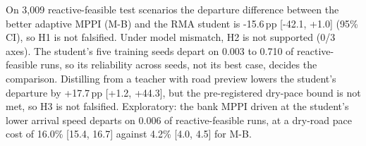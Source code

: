 On 3,009 reactive-feasible test scenarios the departure difference between the better adaptive MPPI (M-B) and the RMA student is -15.6\,pp [-42.1, +1.0] (95\% CI), so H1 is not falsified. Under model mismatch, H2 is not supported (0/3 axes). The student's five training seeds depart on 0.003 to 0.710 of reactive-feasible runs, so its reliability across seeds, not its best case, decides the comparison. Distilling from a teacher with road preview lowers the student's departure by +17.7\,pp [+1.2, +44.3], but the pre-registered dry-pace bound is not met, so H3 is not falsified. Exploratory: the bank MPPI driven at the student's lower arrival speed departs on 0.006 of reactive-feasible runs, at a dry-road pace cost of 16.0\% [15.4, 16.7] against 4.2\% [4.0, 4.5] for M-B.

